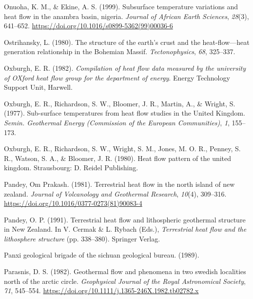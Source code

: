 \documentclass[draft,linenumbers]{agujournal2018}
\begin{document}
\leavevmode{}%
Onuoha, K. M., \& Ekine, A. S. (1999). Subsurface temperature variations
and heat flow in the anambra basin, nigeria. \emph{Journal of African
Earth Sciences}, \emph{28}(3), 641--652.
\url{https://doi.org/10.1016/s0899-5362(99)00036-6}

\leavevmode{}%
Ostrihansky, L. (1980). The structure of the earth's crust and the
heat-flow---heat generation relationship in the {Bohemian Massif}.
\emph{Tectonophysics}, \emph{68}, 325--337.

\leavevmode{}%
Oxburgh, E. R. (1982). \emph{Compilation of heat flow data measured by
the university of OXford heat flow group for the department of energy}.
Energy Technology Support Unit, Harwell.

\leavevmode{}%
Oxburgh, E. R., Richardson, S. W., Bloomer, J. R., Martin, A., \&
Wright, S. (1977). Sub-surface temperatures from heat flow studies in
the {United Kingdom}. \emph{Semin. Geothermal Energy (Commission of the
European Communities)}, \emph{1}, 155--173.

\leavevmode{}%
Oxburgh, E. R., Richardson, S. W., Wright, S. M., Jones, M. O. R.,
Penney, S. R., Watson, S. A., \& Bloomer, J. R. (1980). Heat flow
pattern of the united kingdom. Strausbourg: D. Reidel Publishing.

\leavevmode{}%
Pandey, Om Prakash. (1981). Terrestrial heat flow in the north island of
new zealand. \emph{Journal of Volcanology and Geothermal Research},
\emph{10}(4), 309--316.
\url{https://doi.org/10.1016/0377-0273(81)90083-4}

\leavevmode{}%
Pandey, O. P. (1991). Terrestrial heat flow and lithospheric geothermal
structure in {New Zealand}. In V. Cermak \& L. Rybach (Eds.),
\emph{Terrestrial heat flow and the lithosphere structure} (pp.
338--380). Springer Verlag.

\leavevmode{}%
Panxi geological brigade of the sichuan geological bureau. (1989).

\leavevmode{}%
Parasnis, D. S. (1982). Geothermal flow and phenomena in two swedish
localities north of the arctic circle. \emph{Geophysical Journal of the
Royal Astronomical Society}, \emph{71}, 545--554.
\url{https://doi.org/10.1111/j.1365-246X.1982.tb02782.x}
\end{document}
